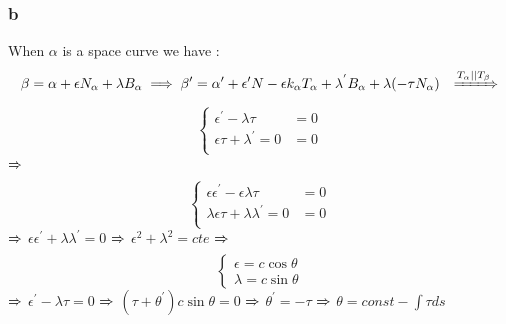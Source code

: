\documentclass[
	12pt, %
]{fphw}
\theoremstyle{plain}
\begin{document}
\subsubsection*{b}
When $\alpha$ is a space curve we have :
\begin{align*}
     &\beta=\alpha+\epsilon N_\alpha + \lambda B_{\alpha} \implies \beta'=\alpha'+\epsilon'N-\epsilon k_\alpha T_\alpha + \lambda^{'} B_{\alpha} + \lambda (-\tau N_{\alpha})
     &\xRightarrow{T_\alpha||T_\beta}  
\end{align*}
\[
  \begin{cases}
    \epsilon^{'}-\lambda \tau & = 0\\
    \epsilon\tau + \lambda^{'} = 0 & = 0\\
  \end{cases}
\]
$\xRightarrow{}$
\[
  \begin{cases}
    \epsilon\epsilon^{'}-\epsilon\lambda \tau & = 0\\
    \lambda\epsilon\tau + \lambda\lambda^{'} = 0 & = 0\\
  \end{cases}
\]
$\xRightarrow{}$  $\epsilon\epsilon^{'} + \lambda\lambda^{'} = 0$  $\xRightarrow{}$ $\epsilon^{2} + \lambda^{2} = cte$ $\xRightarrow{}$
\[
  \begin{cases}
    \epsilon = c\cos\theta\\
    \lambda = c\sin\theta
  \end{cases}
\]
$\xRightarrow{}$  $\epsilon^{'}-\lambda \tau = 0 $ $\xRightarrow{}$  $(\tau+\theta^{'}) c\sin\theta = 0$ $\xRightarrow{}$ $\theta^{'} = -\tau$
$\xRightarrow{}$
$\theta = const - \int{\tau ds}$
\end{document}
